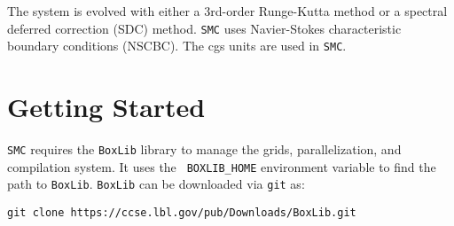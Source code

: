 \documentclass[11pt,letterpaper]{article}
\begin{document}
The system is evolved with either a 3rd-order Runge-Kutta method or a
spectral deferred correction (SDC) method.  {\tt SMC} uses
Navier-Stokes characteristic boundary conditions (NSCBC).  The cgs
units are used in {\tt SMC}.

\section{Getting Started}

{\tt SMC} requires the {\tt BoxLib} library to manage the grids,
parallelization, and compilation system.  It uses the {\tt
  BOXLIB\_HOME} environment variable to find the path to {\tt BoxLib}.
{\tt BoxLib} can be downloaded via {\tt git} as: \vspace{5pt}

\verb|git clone https://ccse.lbl.gov/pub/Downloads/BoxLib.git|\\
\end{document}
